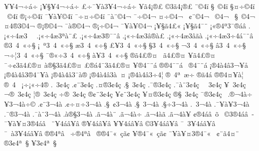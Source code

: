 {^^a5^^a54^^ac^^f7^^e1^^f7
^^a1^^a5^^a7^^a54^^ac^^f7^^e1^^f7
^^a3^^f7^^af^^a5^^e03^^a54^^ac^^f7^^e1^^f7
^^a5^^e34^^a1^^ae^^a3
^^a93^^e34^^a1^^ae^^a3
^^a8^^a94^^ad^^ef
^^a7^^a0^^a94^^ad^^ef
^^a7^^a4^^f7^^a94^^ad^^ef
^^ad^^a0^^a94^^ad^^ef
^^ae^^a1^^f7^^a94^^ad^^ef
^^af^^a5^^e0^^a5^^a94^^ad^^ef
^^af^^f7^^a4^^f7^^a94^^ad^^ef
^^af^^e0^^a8^^a94^^ac
^^af^^f7^^a94^^ac
^^a4^^f7^^a94^^ac^^a0
^^a2^^a8^^a94^^ac
^^ad^^a0^^a94^^ac^^a0
^^a7^^a0^^a94^^ac
^^a44^^ae3^^a94^^ac
^^ae^^a1^^ae^^a94^^ac
^^af^^e0^^ae^^a94^^ac
^^ae^^a1^^f7^^a94^^ac
^^af^^a5^^e0^^a5^^a94^^ac
^^a1^^a5^^a7^^e34^^a3^^ab
^^a1^^a5^^a7^^e34^^af^^a8^^ad
^^a1^^ab^^ae4^^aa3^^af^^ae^^e1^^e2
.^^a1^^ab^^f74^^e63^^a0^^ad^^a0
.^^a1^^ab^^f74^^e63^^aa^^e0^^a8^^a3
.^^a1^^ab^^f74^^e63^^ae^^af^^a8^^e2
.^^a1^^ab^^f74^^e63^^e2^^ae^^e0^^a3
.^^a1^^ab^^f74^^e63^^e2^^e3^^e0
.^^a1^^ab^^f74^^e63^^f74^^e1^^af^^a8^^e2
^^ae3^^a04^^ad^^a0^^ab^^f7^^a7
^^a1^^a0^^aa3^^a04^^ad^^a0^^ab^^f7^^a7
^^e63^^a04^^ad^^a0^^ab^^f7^^a7
^^a3^^a5^^ad3^^a04^^ad^^a0^^ab^^f7^^a7
^^a73^^a04^^ad^^a0^^ab^^f7^^a7
^^ac3^^a04^^ad^^a0^^ab^^f7^^a7
^^ad^^e23^^a04^^ad^^a0^^ab^^f7^^a7
^^ac^^f7^^a63^^a04^^ad^^a0^^ab^^f7^^a7
^^af^^ae^^ab^^f73^^a04^^ad^^a0^^ab^^f7^^a7
^^e0^^a53^^a04^^ad^^a0^^ab^^f7^^a7
^^ae^^e34^^a3^^ae^^a4
^^a0^^e34^^a3^^ae^^a4
^^a5^^e34^^a3^^ae^^a4
^^af^^f7^^a23^^e34^^a3^^ae^^a4
^^e0^^ae^^a73^^e34^^a3^^ae^^a4
^^a3^^ae^^e14^^af3^^e34^^a3^^ae^^a4
^^a5^^ae4^^af^^a8^^e1
^^ae^^ae4^^af^^a8^^e1
^^a0^^ae4^^af^^a8^^e1
^^a1^^ae4^^e04^^e23^^ac^^a5^^e5
^^a1^^ae4^^e04^^e23^^ae4^^af^^a5^^e0
^^a1^^ae4^^e04^^e23^^af^^e0^^ae
^^a1^^ae4^^e04^^e23^^e0^^a0^^a4
^^a1^^ae4^^e04^^e23^^f74^^ad^^a6
^^ae^^a04^^aa^^a0^^e6^^f7
^^ae^^e34^^e1
^^ae^^ae4^^a4^^a5^^e0^^a6
^^ae^^a04^^ad^^a0
^^a1^^f7^^a1^^ab^^f74^^ae
.^^ad^^a03^^a24^^e7
.^^a2^^a83^^a24^^e7
.^^a4^^ae3^^a24^^e7
.^^a7^^a03^^a24^^e7
.^^af^^ae3^^a24^^e7
.^^af^^e0^^a83^^a24^^e7
^^a0^^ad^^a03^^a24^^e7
^^a5^^ad^^a03^^a24^^e7
^^ac^^ae^^ad^^a03^^a24^^e7
^^a6^^ae^^ad^^a03^^a24^^e7
^^f7^^ae^^ad^^a03^^a24^^e7
^^ae^^a2^^a83^^a24^^e7
^^a5^^a2^^a83^^a24^^e7
^^a5^^a4^^ae3^^a24^^e7
^^ae^^a7^^a03^^a24^^e7
^^af^^ae3^^a24^^e7^^a0
.^^ae^^ac4^^e0^^f7
^^a53^^ac4^^e0^^f7^^a9
.^^a2^^a83^^ac4^^e0
.^^a2^^f7^^a4^^f73^^ac4^^e0
.^^a7^^a0^^a23^^ac4^^e0
.^^a7^^a03^^ac4^^e0
.^^a7^^f73^^ac4^^e0
.^^ad^^a03^^ac4^^e0
.^^af^^a5^^e0^^a53^^ac4^^e0
.^^af^^ae3^^ac4^^e0
.^^af^^e0^^a83^^ac4^^e0
.^^e0^^ae^^a73^^ac4^^e0
.^^e3^^ac4^^e0^^a8
.^^e3^^ac4^^e0^^f7
.^^e3^^ac4^^e0^^e3
.^^e3^^ac4^^e0^^a5
^^a2^^ae4^^e1^^e2^^a0^^ad^^ad^^f5
^^ad^^a0^^a93^^ae4^^e1^^e2^^a0^^ad^^ad
^^af^^a5^^e0^^a5^^a43^^ae4^^e1^^e2^^a0^^ad^^ad
^^a8^^a54^^e1^^e2^^a5^^e2  
^^ae^^a54^^e1^^e2^^a5^^e2  
^^a5^^a54^^e1^^e2^^a5^^e2  
^^a93^^a54^^e1^^e2^^a5^^e2  
^^af^^a0^^ad3^^a54^^e1^^e2^^a5^^e2
^^af^^a0^^e03^^a54^^e1^^e2^^a5^^e2
^^ae^^ae4^^aa^^e2^^a0^^ad
^^f7^^ae4^^aa^^e2^^a0^^ad
^^ae^^ae4^^af^^ab^^a0^^e7^^e3^^a2
^^a5^^ae4^^af^^ab^^a0^^e7^^e3^^a2
^^af^^a5^^e0^^a5^^a43^^ae4^^af^^ab^^a0
^^a2^^a8^^e34^^a4^^a8
^^ae3^^a24^^aa^^a0^^a7
^^a53^^a24^^aa^^a0^^a7
}
